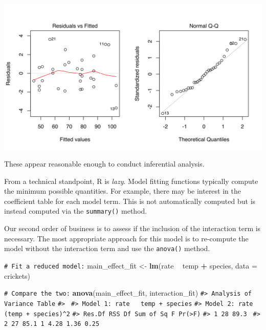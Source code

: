 \documentclass[11pt]{book}
\newenvironment{Shaded}{\begin{snugshade}}{\end{snugshade}}
\newcommand{\CommentTok}[1]{\textcolor[rgb]{0.56,0.35,0.01}{\textit{#1}}}
\newcommand{\DataTypeTok}[1]{\textcolor[rgb]{0.13,0.29,0.53}{#1}}
\newcommand{\KeywordTok}[1]{\textcolor[rgb]{0.13,0.29,0.53}{\textbf{#1}}}
\newcommand{\NormalTok}[1]{#1}
\newcommand{\OperatorTok}[1]{\textcolor[rgb]{0.81,0.36,0.00}{\textbf{#1}}}
\newcommand{\StringTok}[1]{\textcolor[rgb]{0.31,0.60,0.02}{#1}}
\renewcommand{\CommentTok}[1]{\textcolor[rgb]{0.41,0.41,0.41}{\texttt{#1}}}
\begin{document}
\begin{center}\includegraphics[width=1\linewidth]{figures/tidyverse-interaction-plots-1} \end{center}

These appear reasonable enough to conduct inferential analysis.

From a technical standpoint, R is \emph{lazy}. Model fitting functions typically compute the minimum possible quantities. For example, there may be interest in the coefficient table for each model term. This is not automatically computed but is instead computed via the \texttt{summary()} method.

Our second order of business is to assess if the inclusion of the interaction term is necessary. The most appropriate approach for this model is to re-compute the model without the interaction term and use the \texttt{anova()} method.

\begin{Shaded}
\begin{Highlighting}[]
\CommentTok{# Fit a reduced model:}
\NormalTok{main_effect_fit <-}\StringTok{  }\KeywordTok{lm}\NormalTok{(rate }\OperatorTok{~}\StringTok{ }\NormalTok{temp }\OperatorTok{+}\StringTok{ }\NormalTok{species, }\DataTypeTok{data =}\NormalTok{ crickets) }

\CommentTok{# Compare the two:}
\KeywordTok{anova}\NormalTok{(main_effect_fit, interaction_fit)}
\CommentTok{#> Analysis of Variance Table}
\CommentTok{#> }
\CommentTok{#> Model 1: rate ~ temp + species}
\CommentTok{#> Model 2: rate ~ (temp + species)^2}
\CommentTok{#>   Res.Df  RSS Df Sum of Sq    F Pr(>F)}
\CommentTok{#> 1     28 89.3                         }
\CommentTok{#> 2     27 85.1  1      4.28 1.36   0.25}
\end{Highlighting}
\end{Shaded}
\end{document}
